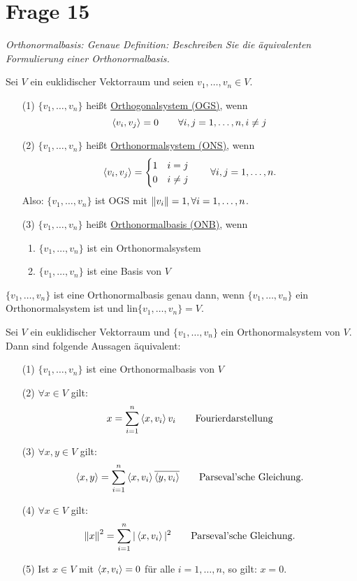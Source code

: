 \section{Frage 15}
\textit{Orthonormalbasis: Genaue Definition: Beschreiben Sie die äquivalenten 
Formulierung einer Orthonormalbasis.}
\begin{definition}
    Sei $V$ ein euklidischer Vektorraum und seien $v_1,\dots,v_n\in V$.
    \begin{enumerate}
        \item[(1)] $\{v_1,\dots,v_n\}$ heißt \underline{Orthogonalsystem (OGS)}, wenn
        \[\left\langle v_i,v_j \right\rangle = 0\qquad\forall i,j=1,\dots,n, i\neq j\] 
        \item[(2)] $\{v_1,\dots,v_n\}$ heißt \underline{Orthonormalsystem (ONS)}, wenn
        \[
            \left\langle v_i,v_j \right\rangle = \begin{cases}
                1 &i = j\\
                0 &i \neq j
            \end{cases}\qquad\forall i,j =1,\dots,n
        .\]
        Also: $\{v_1,\dots,v_n\}$ ist OGS mit $\left\lVert v_i \right\rVert=1, \forall i = 1,\dots,n$.
        \item[(3)] $\{v_1,\dots,v_n\}$ heißt \underline{Orthonormalbasis (ONB)}, wenn
        \begin{enumerate}
            \item $\{v_1,\dots,v_n\}$ ist ein Orthonormalsystem
            \item $\{v_1,\dots,v_n\}$ ist eine Basis von $V$
        \end{enumerate}
    \end{enumerate}
\end{definition}
\begin{corollary}
    $\{v_1,\dots,v_n\}$ ist eine Orthonormalbasis genau dann, wenn $\{v_1,\dots,v_n\}$
    ein Orthonormalsystem ist und $\mathrm{lin}\{v_1,\dots,v_n\}=V$.
\end{corollary}
\begin{theorem}
    Sei $V$ ein euklidischer Vektorraum und $\{v_1,\dots,v_n\}$ ein Orthonormalsystem 
    von $V$. Dann sind folgende Aussagen äquivalent:
    \begin{enumerate}
        \item[(1)] $\{v_1,\dots,v_n\}$ ist eine Orthonormalbasis von $V$
        \item[(2)] $\forall x\in V$ gilt:
        \[
            x = \sum_{i = 1}^{n}\left\langle x,v_i \right\rangle v_i\qquad\text{Fourierdarstellung}  
        \]
        \item[(3)] $\forall x,y\in V$ gilt:
        \[
            \left\langle x,y \right\rangle = \sum_{i=1}^{n}\left\langle x,v_i \right\rangle\overline{\left\langle y,v_i \right\rangle}
            \qquad\text{Parseval'sche Gleichung}   
        .\]
        \item[(4)] $\forall x \in V$ gilt:
        \[
            \left\lVert x \right\rVert^2 = \sum_{i = 1}^{n}\vert \left\langle x,v_i \right\rangle\vert^2
            \qquad \text{Parseval'sche Gleichung}    
        .\]
        \item[(5)] Ist $x\in V$ mit $\left\langle x,v_i \right\rangle = 0$ für alle $i=1,\dots,n$, so gilt: $x=0$. 
    \end{enumerate}
\end{theorem}